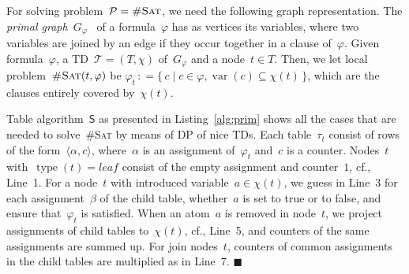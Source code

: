 \documentclass{llncs}
\newcommand{\SB}{\{\,}%
\newcommand{\SM}{\;{|}\;}%
\newcommand{\SE}{\,\}}%
\newcommand{\eqdef}{\ensuremath{\,\mathrel{\mathop:}=}}
\newcommand{\cSAT}{\textsc{\#Sat}\xspace}%
\newcommand{\algo}[1]{\ensuremath{\mathsf{#1}}}
\newcommand{\tab}[1]{\ensuremath{\tau_{#1}}}
\DeclareMathOperator{\var}{var}
\DeclareMathOperator{\type}{type}
\newcommand{\leaf}{\textit{leaf}}
\renewenvironment{example}{\begin{EXa}}{\hfill\ensuremath{\blacksquare}\end{EXa}}
\begin{document}
\noindent For solving problem~$\mathcal{P}=\cSAT$, we need the following graph representation.
The \emph{primal graph}~$G_\varphi$~\cite{SamerSzeider10b} of a formula~$\varphi$
has as vertices its variables, where two variables are joined by an edge
if they occur together in a clause of~$\varphi$.
Given formula~$\varphi$, a TD~$\mathcal{T}=(T,\chi)$ of~$G_\varphi$
and a node~$t\in T$.
Then, we
let local problem~$\cSAT(t, \varphi)$ be $\varphi_t \eqdef \SB c \SM c \in \varphi, \var(c) \subseteq \chi(t)\SE$, which are the clauses entirely covered by~$\chi(t)$.


%

\begin{example}
Table algorithm~$\algo{S}$ as presented in Listing~\ref{alg:prim} shows all the cases that are needed to solve~\cSAT by means of DP of nice TDs.
Each table~$\tab{t}$ consist of rows of the form~$\langle \alpha, c\rangle$,
where~$\alpha$ is an assignment of~$\varphi_t$ and~$c$ is a counter. %
Nodes~$t$ with~$\type(t)=\leaf$ consist of the empty assignment and counter~$1$, cf., Line~1.
For a node~$t$ with introduced variable~$a\in\chi(t)$, we guess in Line~3 for each assignment~$\beta$ of the child table, whether~$a$ is set to true or to false, and ensure that~$\varphi_t$ is satisfied.
When an atom~$a$ is removed in node~$t$, we project assignments of child tables to~$\chi(t)$, cf., Line~5, and counters of the same assignments are summed up.
For join nodes~$t$, counters of common assignments in the child tables are multiplied as in Line~7.
\end{example}
\end{document}
